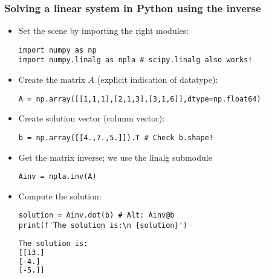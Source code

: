 \begin{frame}[fragile]
  \frametitle{Solving a linear system in Python using the inverse}
  \begin{itemize}
    \item Set the scene by importing the right modules:
    \begin{lstlisting}
import numpy as np
import numpy.linalg as npla # scipy.linalg also works!
    \end{lstlisting}
    \item Create the matrix $A$ (explicit indication of datatype):
    \begin{lstlisting}
A = np.array([[1,1,1],[2,1,3],[3,1,6]],dtype=np.float64)
    \end{lstlisting}\pause
    \item Create solution vector (column vector):
    \begin{lstlisting}
b = np.array([[4.,7.,5.]]).T # Check b.shape!
    \end{lstlisting}\pause
    \item Get the matrix inverse; we use the linalg submodule
    \begin{lstlisting}
Ainv = npla.inv(A)
    \end{lstlisting}\pause
    \item Compute the solution:  \vspace{-1em}
    \begin{multicols}{2}
\begin{lstlisting}[linewidth=0.45\textwidth]
solution = Ainv.dot(b) # Alt: Ainv@b
print(f'The solution is:\n {solution}')
\end{lstlisting}      \break
\begin{lstlisting}[language=sh,style=output,linewidth=0.45\textwidth]
The solution is:
[[13.]
[-4.]
[-5.]]
\end{lstlisting}
\end{multicols}
  \end{itemize}
\end{frame}

